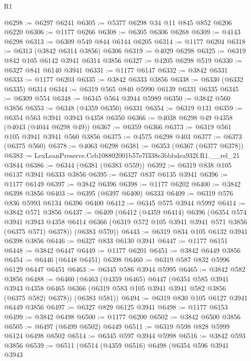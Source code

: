 \begin{lexlean}{R1}
\begin{coremodule}
@6298 := @6297 @6241
@6305 := @5377 @6298 @34 @11 @845 @852 @6206 @6220
@6306 := @1177 @6266
@6308 := @6305 @6306 @6268
@6309 := @4143 @6298
@6313 := @6309 @549 @844 @6144 @6205
@6314 := @1177 @6204
@6318 := @6313 (@3842 @6314 @3856) @6306
@6319 := @4029 @6298
@6325 := @6319 @842 @105 @6142 @3941 @6314 @3856
@6327 := @4205 @6298 @519
@6330 := @6327 @841 @6140 @3941
@6331 := @1177 @6147
@6332 := @3842 @6331
@6333 := @1177 @6203
@6335 := @3842 @6333 @3856
@6338 := @6330 (@6332 @6335) @6314
@6344 := @6319 @565 @840 @5990 @6139 @6331 @6335
@6345 := @6309 @554
@6348 := @6345 @564 @3944 @5989
@6350 := @3842 @560 @3856
@6353 := @6348 (@4359 @6350) @6331
@6354 := @6319 @131
@6359 := @6354 @563 @3941 @3943 @4358 @6350
@6366 := @4038 @6298 @49 @4358 (@4043 (@4044 @6298 @49))
@6367 := @6359 @6366
@6373 := @6319 @561 @105 @3941 @3941 @560 @3856
@6375 := @4575 @6298 @403
@6377 := @6373 (@6375 @560)
@6378 := @4063 @6298
@6381 := @6353 (@6367 (@6377 @6378))
@6383 := LexLeanPreserve.Ceb108802001b57e7f338e3bbbdea932f.R1.__rel_21 @3844
@6386 := @6344 (@6381 (@6383 @559))
@6392 := @6319 @838 @105 @6137 @3941 @6333 @3856
@6395 := @6327 @837 @6135 @3941
@6396 := @1177 @6149
@6397 := @3842 @6396
@6398 := @1177 @6202
@6400 := @3842 @6398 @3856
@6403 := @6395 (@6397 @6400) @6333
@6409 := @6319 @576 @836 @5993 @6134 @6396 @6400
@6412 := @6345 @575 @3944 @5992
@6414 := @3842 @571 @3856
@6437 := @6409
    (@6412
      (@4359 @6414)
      @6396
      (@6354
        @574
        @3941
        @3943
        @4358
        @6414
        @6366
        (@6319 @572 @105 @3941 @3941 @571 @3856 (@6375 @571) @6378))
      (@6383 @570))
@6443 := @6319 @834 @105 @6132 @3941 @6398 @3856
@6446 := @6327 @833 @6130 @3941
@6447 := @1177 @6151
@6448 := @3842 @6447
@6449 := @1177 @6201
@6451 := @3842 @6449 @3856
@6454 := @6446 (@6448 @6451) @6398
@6460 := @6319 @587 @832 @5996 @6129 @6447 @6451
@6463 := @6345 @586 @3944 @5995
@6465 := @3842 @582 @3856
@6488 := @6460
    (@6463
      (@4359 @6465)
      @6447
      (@6354
        @585
        @3941
        @3943
        @4358
        @6465
        @6366
        (@6319 @583 @105 @3941 @3941 @582 @3856 (@6375 @582) @6378))
      (@6383 @581))
@6494 := @6319 @830 @105 @6127 @3941 @6449 @3856
@6497 := @6327 @829 @6125 @3941
@6498 := @1177 @6153
@6499 := @3842 @6498
@6500 := @1177 @6200
@6502 := @3842 @6500 @3856
@6505 := @6497 (@6499 @6502) @6449
@6511 := @6319 @598 @828 @5999 @6124 @6498 @6502
@6514 := @6345 @597 @3944 @5998
@6516 := @3842 @593 @3856
@6539 := @6511
    (@6514
      (@4359 @6516)
      @6498
      (@6354
        @596
        @3941
        @3943

\end{coremodule}
\end{lexlean}
